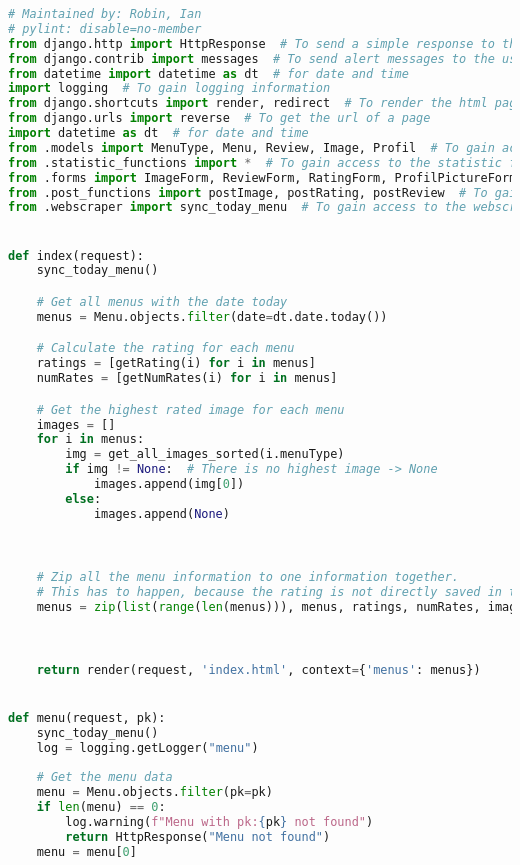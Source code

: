 \begin{lstlisting}[language=Python]
# Maintained by: Robin, Ian
# pylint: disable=no-member
from django.http import HttpResponse  # To send a simple response to the user
from django.contrib import messages  # To send alert messages to the user
from datetime import datetime as dt  # for date and time
import logging  # To gain logging information
from django.shortcuts import render, redirect  # To render the html page and redirect to another page
from django.urls import reverse  # To get the url of a page
import datetime as dt  # for date and time
from .models import MenuType, Menu, Review, Image, Profil  # To gain access to the database
from .statistic_functions import *  # To gain access to the statistic functions
from .forms import ImageForm, ReviewForm, RatingForm, ProfilPictureForm  # Create user forms
from .post_functions import postImage, postRating, postReview  # To gain access to the post functions
from .webscraper import sync_today_menu  # To gain access to the webscraper


def index(request):
    sync_today_menu()

    # Get all menus with the date today
    menus = Menu.objects.filter(date=dt.date.today())

    # Calculate the rating for each menu
    ratings = [getRating(i) for i in menus]
    numRates = [getNumRates(i) for i in menus]

    # Get the highest rated image for each menu
    images = []
    for i in menus:
        img = get_all_images_sorted(i.menuType)
        if img != None:  # There is no highest image -> None
            images.append(img[0])
        else:
            images.append(None)


    
    # Zip all the menu information to one information together.
    # This has to happen, because the rating is not directly saved in the database object.
    menus = zip(list(range(len(menus))), menus, ratings, numRates, images)

    

    return render(request, 'index.html', context={'menus': menus})


def menu(request, pk):
    sync_today_menu()
    log = logging.getLogger("menu")
    
    # Get the menu data
    menu = Menu.objects.filter(pk=pk)
    if len(menu) == 0:
        log.warning(f"Menu with pk:{pk} not found")
        return HttpResponse("Menu not found")
    menu = menu[0]
    

\end{lstlisting}
